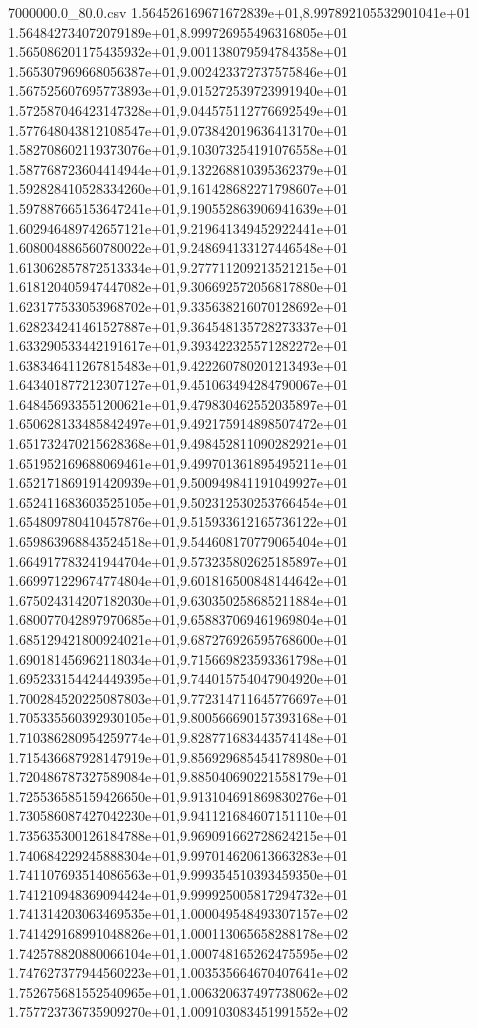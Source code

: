 \begin{filecontents*}{7000000.0_80.0.csv}
1.564526169671672839e+01,8.997892105532901041e+01
1.564842734072079189e+01,8.999726955496316805e+01
1.565086201175435932e+01,9.001138079594784358e+01
1.565307969668056387e+01,9.002423372737575846e+01
1.567525607695773893e+01,9.015272539723991940e+01
1.572587046423147328e+01,9.044575112776692549e+01
1.577648043812108547e+01,9.073842019636413170e+01
1.582708602119373076e+01,9.103073254191076558e+01
1.587768723604414944e+01,9.132268810395362379e+01
1.592828410528334260e+01,9.161428682271798607e+01
1.597887665153647241e+01,9.190552863906941639e+01
1.602946489742657121e+01,9.219641349452922441e+01
1.608004886560780022e+01,9.248694133127446548e+01
1.613062857872513334e+01,9.277711209213521215e+01
1.618120405947447082e+01,9.306692572056817880e+01
1.623177533053968702e+01,9.335638216070128692e+01
1.628234241461527887e+01,9.364548135728273337e+01
1.633290533442191617e+01,9.393422325571282272e+01
1.638346411267815483e+01,9.422260780201213493e+01
1.643401877212307127e+01,9.451063494284790067e+01
1.648456933551200621e+01,9.479830462552035897e+01
1.650628133485842497e+01,9.492175914898507472e+01
1.651732470215628368e+01,9.498452811090282921e+01
1.651952169688069461e+01,9.499701361895495211e+01
1.652171869191420939e+01,9.500949841191049927e+01
1.652411683603525105e+01,9.502312530253766454e+01
1.654809780410457876e+01,9.515933612165736122e+01
1.659863968843524518e+01,9.544608170779065404e+01
1.664917783241944704e+01,9.573235802625185897e+01
1.669971229674774804e+01,9.601816500848144642e+01
1.675024314207182030e+01,9.630350258685211884e+01
1.680077042897970685e+01,9.658837069461969804e+01
1.685129421800924021e+01,9.687276926595768600e+01
1.690181456962118034e+01,9.715669823593361798e+01
1.695233154424449395e+01,9.744015754047904920e+01
1.700284520225087803e+01,9.772314711645776697e+01
1.705335560392930105e+01,9.800566690157393168e+01
1.710386280954259774e+01,9.828771683443574148e+01
1.715436687928147919e+01,9.856929685454178980e+01
1.720486787327589084e+01,9.885040690221558179e+01
1.725536585159426650e+01,9.913104691869830276e+01
1.730586087427042230e+01,9.941121684607151110e+01
1.735635300126184788e+01,9.969091662728624215e+01
1.740684229245888304e+01,9.997014620613663283e+01
1.741107693514086563e+01,9.999354510393459350e+01
1.741210948369094424e+01,9.999925005817294732e+01
1.741314203063469535e+01,1.000049548493307157e+02
1.741429168991048826e+01,1.000113065658288178e+02
1.742578820880066104e+01,1.000748165262475595e+02
1.747627377944560223e+01,1.003535664670407641e+02
1.752675681552540965e+01,1.006320637497738062e+02
1.757723736735909270e+01,1.009103083451991552e+02

\end{filecontents*}
